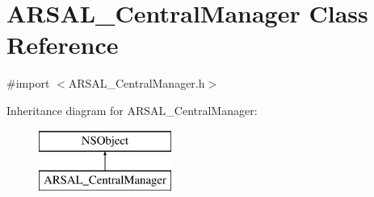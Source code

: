 \hypertarget{interfaceARSAL__CentralManager}{}\section{A\+R\+S\+A\+L\+\_\+\+Central\+Manager Class Reference}
\label{interfaceARSAL__CentralManager}


{\ttfamily \#import $<$A\+R\+S\+A\+L\+\_\+\+Central\+Manager.\+h$>$}

Inheritance diagram for A\+R\+S\+A\+L\+\_\+\+Central\+Manager\+:\begin{figure}[H]
\begin{center}
\leavevmode
\includegraphics[height=2.000000cm]{interfaceARSAL__CentralManager}
\end{center}
\end{figure}
